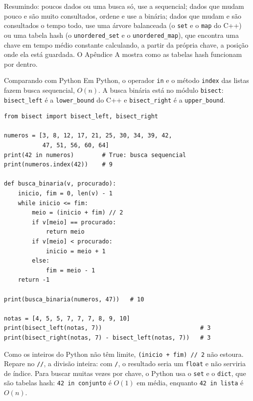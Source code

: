 Resumindo: poucos dados ou uma busca só, use a sequencial; dados que mudam pouco e são muito consultados, ordene e use a binária; dados que mudam e são consultados o tempo todo, use uma árvore balanceada (o \texttt{set} e o \texttt{map} do C++) ou uma tabela hash (o \texttt{unordered\_set} e o \texttt{unordered\_map}), que encontra uma chave em tempo médio constante calculando, a partir da própria chave, a posição onde ela está guardada. O Apêndice A mostra como as tabelas hash funcionam por dentro.

\begin{destaque}{Comparando com Python}
Em Python, o operador \texttt{in} e o método \texttt{index} das listas fazem busca sequencial, $O(n)$. A busca binária está no módulo \texttt{bisect}: \texttt{bisect\_left} é a \texttt{lower\_bound} do C++ e \texttt{bisect\_right} é a \texttt{upper\_bound}.

\begin{codigo}
\begin{Verbatim}[breaklines=true, breaksymbolleft={}, fontsize=\footnotesize]
from bisect import bisect_left, bisect_right

numeros = [3, 8, 12, 17, 21, 25, 30, 34, 39, 42,
           47, 51, 56, 60, 64]
print(42 in numeros)        # True: busca sequencial
print(numeros.index(42))    # 9

def busca_binaria(v, procurado):
    inicio, fim = 0, len(v) - 1
    while inicio <= fim:
        meio = (inicio + fim) // 2
        if v[meio] == procurado:
            return meio
        if v[meio] < procurado:
            inicio = meio + 1
        else:
            fim = meio - 1
    return -1

print(busca_binaria(numeros, 47))   # 10

notas = [4, 5, 5, 7, 7, 7, 8, 9, 10]
print(bisect_left(notas, 7))                            # 3
print(bisect_right(notas, 7) - bisect_left(notas, 7))   # 3
\end{Verbatim}
\end{codigo}

Como os inteiros do Python não têm limite, \texttt{(inicio + fim) // 2} não estoura. Repare no \texttt{//}, a divisão inteira: com \texttt{/}, o resultado seria um \texttt{float} e não serviria de índice. Para buscar muitas vezes por chave, o Python usa o \texttt{set} e o \texttt{dict}, que são tabelas hash: \texttt{42 in conjunto} é $O(1)$ em média, enquanto \texttt{42 in lista} é $O(n)$.
\end{destaque}

